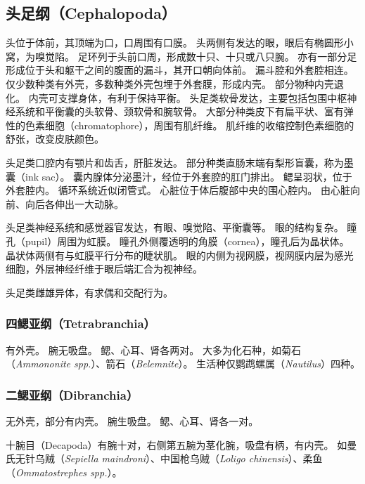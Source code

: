 \documentclass[11pt]{article}
\begin{document}
\subsection{头足纲（Cephalopoda）}
头位于体前，其顶端为口，口周围有口膜。
头两侧有发达的眼，眼后有椭圆形小窝，为嗅觉陷。
足环列于头前口周，形成数十只、十只或八只腕。
亦有一部分足形成位于头和躯干之间的腹面的漏斗，其开口朝向体前。
漏斗腔和外套腔相连。
仅少数种类有外壳，多数种类外壳包埋于外套膜，形成内壳。
部分物种内壳退化。
内壳可支撑身体，有利于保持平衡。
头足类软骨发达，主要包括包围中枢神经系统和平衡囊的头软骨、颈软骨和腕软骨。
大部分种类皮下有扁平状、富有弹性的色素细胞（chromatophore），周围有肌纤维。
肌纤维的收缩控制色素细胞的舒张，改变皮肤颜色。

\newline

头足类口腔内有颚片和齿舌，肝脏发达。
部分种类直肠末端有梨形盲囊，称为墨囊（ink sac）。
囊内腺体分泌墨汁，经位于外套腔的肛门排出。
鳃呈羽状，位于外套腔内。
循环系统近似闭管式。
心脏位于体后腹部中央的围心腔内。
由心脏向前、向后各伸出一大动脉。

\newline

头足类神经系统和感觉器官发达，有眼、嗅觉陷、平衡囊等。
眼的结构复杂。
瞳孔（pupil）周围为虹膜。
瞳孔外侧覆透明的角膜（cornea），瞳孔后为晶状体。
晶状体两侧有与虹膜平行分布的睫状肌。
眼的内侧为视网膜，视网膜内层为感光细胞，外层神经纤维于眼后端汇合为视神经。

\newline

头足类雌雄异体，有求偶和交配行为。

\subsubsection{四鳃亚纲（Tetrabranchia）}
有外壳。
腕无吸盘。
鳃、心耳、肾各两对。
大多为化石种，如菊石（\textit{Ammononite spp.}）、箭石（\textit{Belemnite}）。
生活种仅鹦鹉螺属（\textit{Nautilus}）四种。

\subsubsection{二鳃亚纲（Dibranchia）}
无外壳，部分有内壳。
腕生吸盘。
鳃、心耳、肾各一对。

\newline

十腕目（Decapoda）有腕十对，右侧第五腕为茎化腕，吸盘有柄，有内壳。
如曼氏无针乌贼（\textit{Sepiella maindroni}）、中国枪乌贼（\textit{Loligo chinensis}）、柔鱼（\textit{Ommatostrephes spp.}）。
\end{document}
